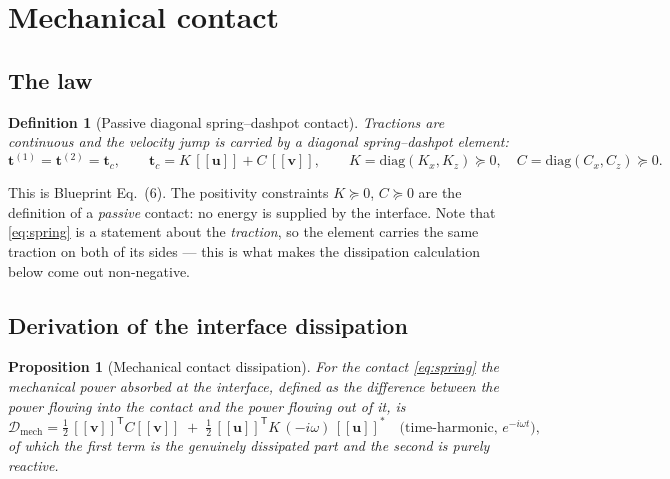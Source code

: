 \documentclass[11pt]{article}
\newcommand{\bu}{\bm{u}}
\newcommand{\bv}{\bm{v}}
\newcommand{\bt}{\bm{t}}
\newcommand{\jmp}[1]{[\![#1]\!]}
\theoremstyle{plain}
\newtheorem{proposition}{Proposition}
\newtheorem{definition}{Definition}
\begin{document}
\section{Mechanical contact}
\label{sec:mech}

\subsection{The law}

\begin{definition}[Passive diagonal spring--dashpot contact]
\label{def:spring}
Tractions are continuous and the velocity jump is carried by a diagonal
spring--dashpot element:
\begin{equation}
  \bt^{(1)} = \bt^{(2)} = \bt_c,
  \qquad
  \bt_c = K\,\jmp{\bu} + C\,\jmp{\bv},
  \qquad K = \mathrm{diag}(K_x,K_z)\succeq 0,\quad
  C = \mathrm{diag}(C_x,C_z)\succeq 0 .
  \label{eq:spring}
\end{equation}
\end{definition}

This is Blueprint Eq.~(6). The positivity constraints $K\succeq0$, $C\succeq0$
are the definition of a \emph{passive} contact: no energy is supplied by the
interface. Note that \eqref{eq:spring} is a statement about the \emph{traction},
so the element carries the same traction on both of its sides --- this is what
makes the dissipation calculation below come out non-negative.

\subsection{Derivation of the interface dissipation}
\label{sec:mech-diss}

\begin{proposition}[Mechanical contact dissipation]
\label{prop:mech-diss}
For the contact \eqref{eq:spring} the mechanical power absorbed at the interface,
defined as the difference between the power flowing into the contact and the
power flowing out of it, is
\begin{equation}
  \mathcal{D}_{\mathrm{mech}}
  = \tfrac12\,\jmp{\bv}^{\mathsf T} C \jmp{\bv}
  \;+\; \tfrac12\,\jmp{\bu}^{\mathsf T} K\,(-i\omega)\,\jmp{\bu}^{*}
  \quad\text{(time-harmonic, }e^{-i\omega t}\text{)},
  \label{eq:mech-diss}
\end{equation}
of which the first term is the genuinely dissipated part and the second is
purely reactive.
\end{proposition}
\end{document}
